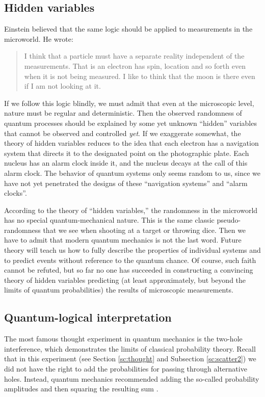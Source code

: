 \documentclass[nochecklpage]{stefan1}
\theoremstyle{definition}
\begin{document}
\subsection{Hidden variables}\label{ss:hidden}
Einstein believed that the same logic should be applied to measurements
in the microworld. He wrote:
%
\begin{quote}
I think that a particle must have a separate reality independent of the
measurements. That is an electron has spin, location and so forth even
when it is not being measured. I like to think that the moon is there
even if I am not looking at it.
\end{quote}
%
If we follow this logic blindly, we must admit that even at the
microscopic level, nature must be regular and deterministic. Then the
observed randomness of quantum processes should be explained by some yet
unknown ``hidden'' variables that cannot be observed and controlled
\emph{yet}. If we exaggerate somewhat, the theory of hidden variables reduces
to the idea that each electron has a navigation system that directs it
to the designated point on the photographic plate. Each nucleus has an
alarm clock inside it, and the nucleus decays at the call of this alarm
clock. The behavior of quantum systems only seems random to us, since
we have not yet penetrated the designs of these ``navigation systems''
and ``alarm clocks''.

According to the theory of ``hidden variables,'' the randomness in the
microworld has no special quantum-mechanical nature. This is the same
classic pseudo-ran\-domness that we see when shooting at a target or
throwing dice. Then we have to admit that modern quantum mechanics is
not the last word. Future theory will teach us how to fully describe the
properties of individual systems and to predict events without reference
to the quantum chance. Of course, such faith cannot be refuted, but so
far no one has succeeded in constructing a convincing theory of hidden
variables predicting (at least approximately, but beyond the limits of
quantum probabilities) the results of microscopic measurements.

\subsection{Quantum-logical interpretation}\label{ss:q-logic}
The most famous thought experiment in quantum mechanics is the two-hole
interference, which demonstrates the limits of classical probability
theory. Recall that in this experiment (see Section \ref{sc:thought}
and Subsection \ref{sc:scatter2}) we did not have the right to add the
probabilities for passing through alternative holes. Instead, quantum
mechanics recommended adding the so-called probability amplitudes and
then squaring the resulting sum \cite{Feynman-lecturesIII}.
\end{document}
